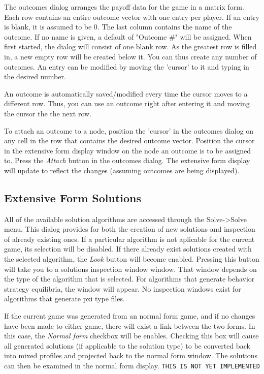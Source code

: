 The outcomes dialog arranges the payoff data for the game in a matrix
form.  Each row contains an entire outcome vector with one entry per
player.  If an entry is blank, it is assumed to be 0.  The last column
contains the name of the outcome.  If no name is given, a default of
"Outcome \#" will be assigned.  When first started, the dialog will consist
of one blank row.  As the greatest row is filled in, a new empty row will
be created below it.  You can thus create any number of outcomes.  An
entry can be modified by moving the 'cursor' to it and typing in the
desired number.

An outcome is automatically saved/modified every time the cursor moves to
a different row.  Thus, you can use an outcome right after entering it and
moving the cursor the the next row.

To attach an outcome to a node, position the 'cursor' in the outcomes
dialog on any cell in the row that contains the desired outcome vector.
Position the cursor in the extensive form display window on the node an
outcome is to be assigned to.  Press the {\em Attach} button in the
outcomes dialog.  The extensive form display will update to reflect the
changes (assuming outcomes are being displayed).


\subsection{Extensive Form Solutions}

All of the available solution algorithms are accessed through the
Solve->Solve menu.  This dialog provides for both the creation of new
solutions and inspection of already existing ones.  If a particular
algorithm is not aplicable for the current game, its selection will be
disabled.  If there already exist solutions created with the selected
algorithm, the {\em Look} button will become enabled.  Pressing this
button will take you to a solutions inspection window window.  That window
depends on the type of the algorithm that is selected.  For algorithms
that generate behavior strategy equilibria, the   window will appear.
No inspection windows exist for algorithms that generate pxi type files.

If the current game was generated from an normal form game, and if no
changes have been made to either game, there will exist a link between the
two forms.  In this case, the {\em Normal form} checkbox will be enables.
Checking this box will cause all generated solutions (if applicable to the
solution type) to be converted back into mixed profiles and projected back
to the normal form window.  The solutions can then be examined in the
normal form display.  {\tt THIS IS NOT YET IMPLEMENTED}

